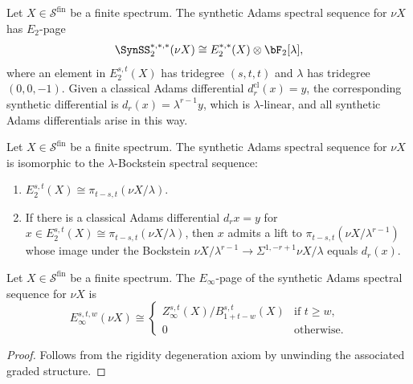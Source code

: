 \begin{axiom}\label{prereq:ax:rigid}
    \leanok
    Let $X \in \mathcal{S}^{\mathrm{fin}}$ be a finite spectrum. The synthetic Adams spectral sequence for $\nu X$ has $E_2$-page
    $$\SynSS_2^{*,*,*}(\nu X) \cong E_2^{*,*}(X) \otimes \bF_2[\lambda],$$
    where an element in $E_2^{s,t}(X)$ has tridegree $(s,t,t)$ and $\lambda$ has tridegree $(0,0,-1)$. Given a classical Adams differential $d_r^{\mathrm{cl}}(x) = y$, the corresponding synthetic differential is $d_r(x) = \lambda^{r-1}y$, which is $\lambda$-linear, and all synthetic Adams differentials arise in this way.
\end{axiom}

\begin{axiom}\label{prereq:ax:lambda-bockstein}
    \leanok
    Let $X \in \mathcal{S}^{\mathrm{fin}}$ be a finite spectrum. The synthetic Adams spectral sequence for $\nu X$ is isomorphic to the $\lambda$-Bockstein spectral sequence:
    \begin{enumerate}
        \item $E_2^{s,t}(X) \cong \pi_{t-s,t}(\nu X / \lambda)$.
        \item If there is a classical Adams differential $d_r x = y$ for $x \in E_2^{s,t}(X) \cong \pi_{t-s,t}(\nu X / \lambda)$, then $x$ admits a lift to $\pi_{t-s,t}(\nu X / \lambda^{r-1})$ whose image under the Bockstein $\nu X / \lambda^{r-1} \to \Sigma^{1,-r+1} \nu X / \lambda$ equals $d_r(x)$.
    \end{enumerate}
\end{axiom}

\begin{proposition}\label{prereq:prop:syn-einfty-nuX}
    \leanok
    Let $X \in \mathcal{S}^{\mathrm{fin}}$ be a finite spectrum. The $E_\infty$-page of the synthetic Adams spectral sequence for $\nu X$ is
    $$E_\infty^{s,t,w}(\nu X) \cong \begin{cases}
        Z_\infty^{s,t}(X) / B_{1+t-w}^{s,t}(X) & \text{if } t \ge w, \\
        0 & \text{otherwise}.
    \end{cases}$$
\end{proposition}
\begin{proof}\leanok Follows from the rigidity degeneration axiom by unwinding the associated graded structure.\end{proof}

